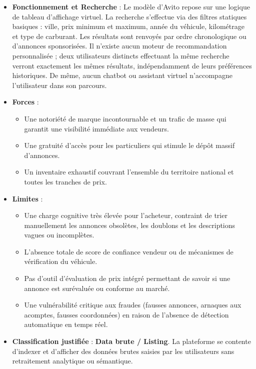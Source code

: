 \documentclass[11pt,a4paper]{article}
\begin{document}
\begin{itemize}
    \item \textbf{Fonctionnement et Recherche} : Le modèle d'Avito repose sur une logique de tableau d'affichage virtuel. La recherche s'effectue via des filtres statiques basiques : ville, prix minimum et maximum, année du véhicule, kilométrage et type de carburant. Les résultats sont renvoyés par ordre chronologique ou d'annonces sponsorisées. Il n'existe aucun moteur de recommandation personnalisée ; deux utilisateurs distincts effectuant la même recherche verront exactement les mêmes résultats, indépendamment de leurs préférences historiques. De même, aucun chatbot ou assistant virtuel n'accompagne l'utilisateur dans son parcours.
    \item \textbf{Forces} : 
    \begin{itemize}
        \item Une notoriété de marque incontournable et un trafic de masse qui garantit une visibilité immédiate aux vendeurs.
        \item Une gratuité d'accès pour les particuliers qui stimule le dépôt massif d'annonces.
        \item Un inventaire exhaustif couvrant l'ensemble du territoire national et toutes les tranches de prix.
    \end{itemize}
    \item \textbf{Limites} :
    \begin{itemize}
        \item Une charge cognitive très élevée pour l'acheteur, contraint de trier manuellement les annonces obsolètes, les doublons et les descriptions vagues ou incomplètes.
        \item L'absence totale de score de confiance vendeur ou de mécanismes de vérification du véhicule.
        \item Pas d'outil d'évaluation de prix intégré permettant de savoir si une annonce est surévaluée ou conforme au marché.
        \item Une vulnérabilité critique aux fraudes (fausses annonces, arnaques aux acomptes, fausses coordonnées) en raison de l'absence de détection automatique en temps réel.
    \end{itemize}
    \item \textbf{Classification justifiée} : \textbf{Data brute / Listing}. La plateforme se contente d'indexer et d'afficher des données brutes saisies par les utilisateurs sans retraitement analytique ou sémantique.
\end{itemize}
\end{document}
